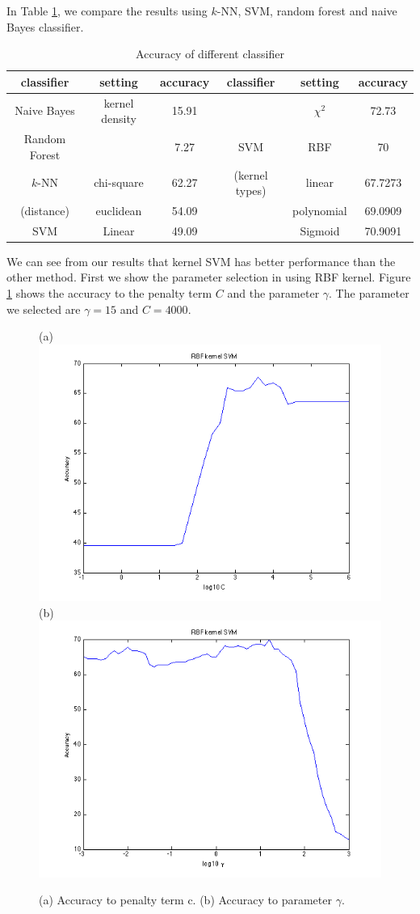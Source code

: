 \documentclass{article} %
\begin{document}
In Table \ref{tbl:classifers}, we compare the results using $k$-NN, SVM, random forest and naive Bayes classifier.


\begin{table}[t]
\caption{Accuracy of different classifier}
\begin{center}
\label{tbl:classifers}
\begin{tabular}{|c|c|c|c|c|c|}
\hline
   classifier  & setting      &accuracy   & classifier    & setting      & accuracy\\
\hline
Naive Bayes  & kernel density  & 15.91       &     &$\chi^2$  &72.73\\ \cline{1-3} \cline{5-6}
Random Forest &                & 7.27     &   SVM    & RBF               &70\\ \cline{1-3} \cline{5-6}
$k$-NN     & chi-square        & 62.27    &    (kernel types)    & linear            &67.7273\\ \cline{2-3} \cline{5-6}
(distance) & euclidean         & 54.09   &       & polynomial        &69.0909\\ \cline{1-3} \cline{5-6}
SVM& Linear  &49.09   &    & Sigmoid           &70.9091\\ \hline
\end{tabular}
\end{center}
\end{table}

We can see from our results that kernel SVM has better performance than the other method. First we show the parameter selection in using RBF kernel. Figure \ref{fig:RBF} shows the accuracy to the penalty term $C$ and the parameter $\gamma$. The parameter we selected are $\gamma = 15$ and $C = 4000$.

\begin{figure}[ht!]
    \centering
    {(a)\includegraphics[width=0.38\linewidth]{../Figure/RBF_cost_accuracy}
    (b)\includegraphics[width=0.38\linewidth]{../Figure/RBF_gamma_accuracy}}
    \caption{(a) Accuracy to penalty term c. (b) Accuracy to parameter $\gamma$. }
    \label{fig:RBF}
\end{figure}
\end{document}
